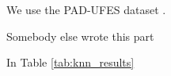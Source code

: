 
We use the PAD-UFES dataset \cite{pacheco2020padufes}.

Somebody else wrote this part \cite{pacheco2020pad}

In Table \ref{tab:knn_results}
